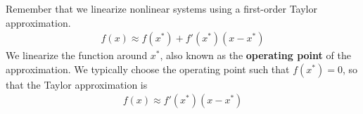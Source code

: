 


Remember that we linearize nonlinear systems using a first-order Taylor approximation.
\begin{align}
f(x) \approx f(x^{*}) + f'(x^{*})(x - x^{*})
\end{align}
We linearize the function around $x^{*}$, also known as the \textbf{operating point} of the approximation.
We typically choose the operating point such that $f(x^{*}) = 0$, so that the Taylor approximation is
\begin{align}
f(x) \approx f'(x^{*})(x - x^{*})
\end{align}

